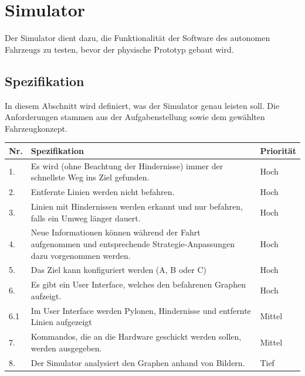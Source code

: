 \documentclass[../main.tex]{subfiles}
\begin{document}
\newpage
\section{Simulator}

Der Simulator dient dazu, die Funktionalität der Software des autonomen Fahrzeugs zu testen, bevor der physische Prototyp gebaut wird.\\

\subsection{Spezifikation}

In diesem Abschnitt wird definiert, was der Simulator genau leisten soll. Die Anforderungen stammen aus der Aufgabenstellung sowie dem gewählten Fahrzeugkonzept.

\begin{table}[htbp!]
    \centering
    \begin{tabularx}{\textwidth}{| l | X | l |}
        \hline
        \textbf{Nr.} & \textbf{Spezifikation} & \textbf{Priorität} \\ \hline
        1. & Es wird (ohne Beachtung der Hindernisse) immer der schnellste Weg ins Ziel gefunden. & Hoch \\ \hline
        2. & Entfernte Linien werden nicht befahren. & Hoch \\ \hline
        3. & Linien mit Hindernissen werden erkannt und nur befahren, falls ein Umweg länger dauert. & Hoch \\ \hline
        4. & Neue Informationen können während der Fahrt aufgenommen und entsprechende Strategie-Anpassungen dazu vorgenommen werden. & Hoch \\ \hline
        5. & Das Ziel kann konfiguriert werden (A, B oder C) & Hoch \\ \hline
        6. & Es gibt ein User Interface, welches den befahrenen Graphen aufzeigt. & Hoch \\ \hline
        6.1 & Im User Interface werden Pylonen, Hindernisse und entfernte Linien aufgezeigt & Mittel \\ \hline
        7. & Kommandos, die an die Hardware geschickt werden sollen, werden ausgegeben. & Mittel \\ \hline
        8. & Der Simulator analysiert den Graphen anhand von Bildern. & Tief \\ \hline
    \end{tabularx}
\end{table}
\end{document}
